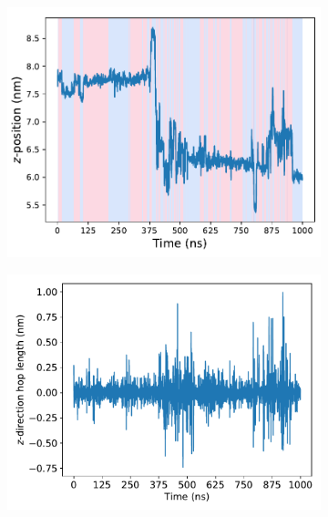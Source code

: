 \documentclass{article}
\begin{document}
  \begin{figure}
  \centering
  \vspace{-0.5cm}
  \begin{subfigure}{0.49\linewidth}
  \includegraphics[width=\linewidth]{breakpoints.pdf}
  \caption{}\label{fig:breakpoints}
  \end{subfigure}
  \begin{subfigure}{0.49\linewidth}
  \includegraphics[width=\linewidth]{first_order_difference.pdf}
  \caption{}\label{fig:first_order_difference}
  \end{subfigure}
  \begin{subfigure}{0.49\linewidth}

\end{subfigure}
\end{figure}
\end{document}
